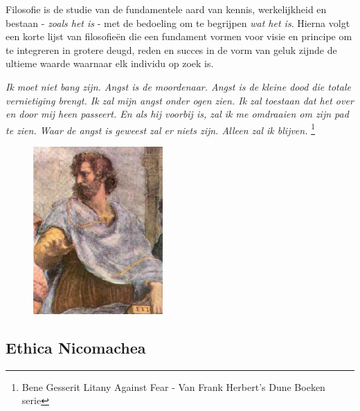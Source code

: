 \documentclass[11pt]{article}
\begin{document}
Filosofie is de studie van de fundamentele aard van kennis, werkelijkheid en bestaan - \textit{zoals het is} - met de bedoeling om te begrijpen \textit{wat het is}. 
Hierna volgt een korte lijst van filosofie\"en die een fundament vormen voor visie en principe om te integreren in grotere deugd, reden en succes in de vorm van geluk zijnde de ultieme waarde waarnaar elk individu op zoek is.

\begin{center}
\textit{
Ik moet niet bang zijn.\linebreak
Angst is de moordenaar.\linebreak
Angst is de kleine dood die totale vernietiging brengt.\linebreak
Ik zal mijn angst onder ogen zien.\linebreak
Ik zal toestaan ​​dat het over en door mij heen passeert.\linebreak
En als hij voorbij is, zal ik me omdraaien om zijn pad te zien.\linebreak
Waar de angst is geweest zal er niets zijn. \linebreak
Alleen zal ik blijven.\linebreak
}
\footnote{Bene Gesserit Litany Against Fear - Van Frank Herbert’s Dune Boeken serie}
\end{center}

\begin{figure}
    \centering
    \includegraphics[width=0.44\textwidth]{aristotle.jpg}
\end{figure}

\subsection{Ethica Nicomachea}
\end{document}
